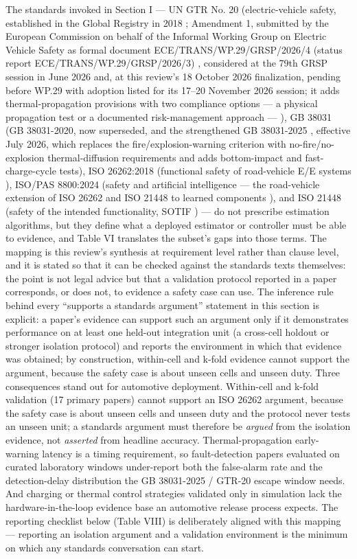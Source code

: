 \documentclass[journal]{IEEEtran}
\begin{document}
The standards invoked in Section I --- UN GTR No. 20 (electric-vehicle safety, established in the Global Registry in 2018 \cite{r106}; Amendment 1, submitted by the European Commission on behalf of the Informal Working Group on Electric Vehicle Safety as formal document ECE/TRANS/WP.29/GRSP/2026/4 (status report ECE/TRANS/WP.29/GRSP/2026/3) \cite{r107}, considered at the 79th GRSP session in June 2026 and, at this review's 18 October 2026 finalization, pending before WP.29 with adoption listed for its 17--20 November 2026 session; it adds thermal-propagation provisions with two compliance options --- a physical propagation test or a documented risk-management approach --- ), GB 38031 (GB 38031-2020, now superseded, and the strengthened GB 38031-2025 \cite{r108}, effective July 2026, which replaces the fire/explosion-warning criterion with no-fire/no-explosion thermal-diffusion requirements and adds bottom-impact and fast-charge-cycle tests), ISO 26262:2018 (functional safety of road-vehicle E/E systems \cite{r109}), ISO/PAS 8800:2024 (safety and artificial intelligence --- the road-vehicle extension of ISO 26262 and ISO 21448 to learned components \cite{r110}), and ISO 21448 (safety of the intended functionality, SOTIF \cite{r111}) --- do not prescribe estimation algorithms, but they define what a deployed estimator or controller must be able to evidence, and Table VI translates the subset's gaps into those terms. The mapping is this review's synthesis at requirement level rather than clause level, and it is stated so that it can be checked against the standards texts themselves: the point is not legal advice but that a validation protocol reported in a paper corresponds, or does not, to evidence a safety case can use. The inference rule behind every ``supports a standards argument'' statement in this section is explicit: a paper's evidence can support such an argument only if it demonstrates performance on at least one held-out integration unit (a cross-cell holdout or stronger isolation protocol) and reports the environment in which that evidence was obtained; by construction, within-cell and k-fold evidence cannot support the argument, because the safety case is about unseen cells and unseen duty. Three consequences stand out for automotive deployment. Within-cell and k-fold validation (17 primary papers) cannot support an ISO 26262 argument, because the safety case is about unseen cells and unseen duty and the protocol never tests an unseen unit; a standards argument must therefore be \textit{argued} from the isolation evidence, not \textit{asserted} from headline accuracy. Thermal-propagation early-warning latency is a timing requirement, so fault-detection papers evaluated on curated laboratory windows under-report both the false-alarm rate and the detection-delay distribution the GB 38031-2025 / GTR-20 escape window needs. And charging or thermal control strategies validated only in simulation lack the hardware-in-the-loop evidence base an automotive release process expects. The reporting checklist below (Table VIII) is deliberately aligned with this mapping --- reporting an isolation argument and a validation environment is the minimum on which any standards conversation can start.
\end{document}
